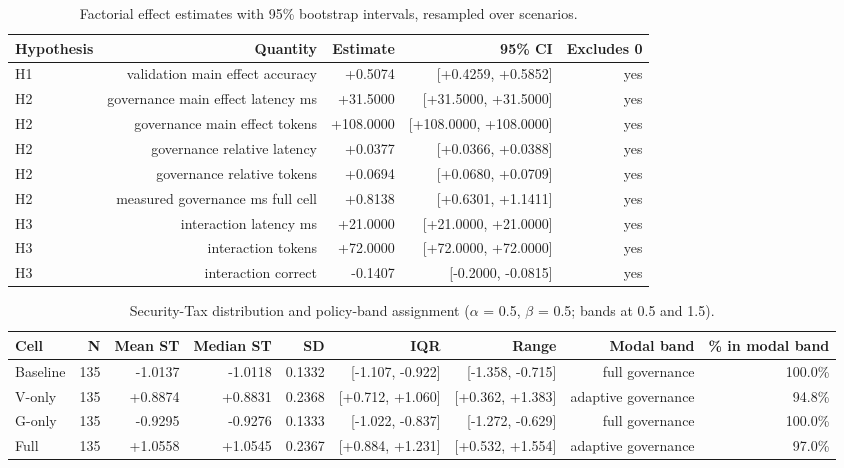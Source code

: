 \begin{table}[htbp]
\centering
\small
\caption{Factorial effect estimates with 95\% bootstrap intervals, resampled over scenarios.}
\label{tab:gmais-5}
\begin{tabular}{lrrrr}
\toprule
Hypothesis & Quantity & Estimate & 95\% CI & Excludes 0 \\
\midrule
H1 & validation main effect accuracy & +0.5074 & [+0.4259, +0.5852] & yes \\
H2 & governance main effect latency ms & +31.5000 & [+31.5000, +31.5000] & yes \\
H2 & governance main effect tokens & +108.0000 & [+108.0000, +108.0000] & yes \\
H2 & governance relative latency & +0.0377 & [+0.0366, +0.0388] & yes \\
H2 & governance relative tokens & +0.0694 & [+0.0680, +0.0709] & yes \\
H2 & measured governance ms full cell & +0.8138 & [+0.6301, +1.1411] & yes \\
H3 & interaction latency ms & +21.0000 & [+21.0000, +21.0000] & yes \\
H3 & interaction tokens & +72.0000 & [+72.0000, +72.0000] & yes \\
H3 & interaction correct & -0.1407 & [-0.2000, -0.0815] & yes \\
\bottomrule
\end{tabular}
\end{table}


\begin{table}[htbp]
\centering
\small
\caption{Security-Tax distribution and policy-band assignment ($\alpha$ = 0.5, $\beta$ = 0.5; bands at 0.5 and 1.5).}
\label{tab:gmais-6}
\begin{tabular}{lrrrrrrrr}
\toprule
Cell & N & Mean ST & Median ST & SD & IQR & Range & Modal band & \% in modal band \\
\midrule
Baseline & 135 & -1.0137 & -1.0118 & 0.1332 & [-1.107, -0.922] & [-1.358, -0.715] & full governance & 100.0\% \\
V-only & 135 & +0.8874 & +0.8831 & 0.2368 & [+0.712, +1.060] & [+0.362, +1.383] & adaptive governance & 94.8\% \\
G-only & 135 & -0.9295 & -0.9276 & 0.1333 & [-1.022, -0.837] & [-1.272, -0.629] & full governance & 100.0\% \\
Full & 135 & +1.0558 & +1.0545 & 0.2367 & [+0.884, +1.231] & [+0.532, +1.554] & adaptive governance & 97.0\% \\
\bottomrule
\end{tabular}
\end{table}


